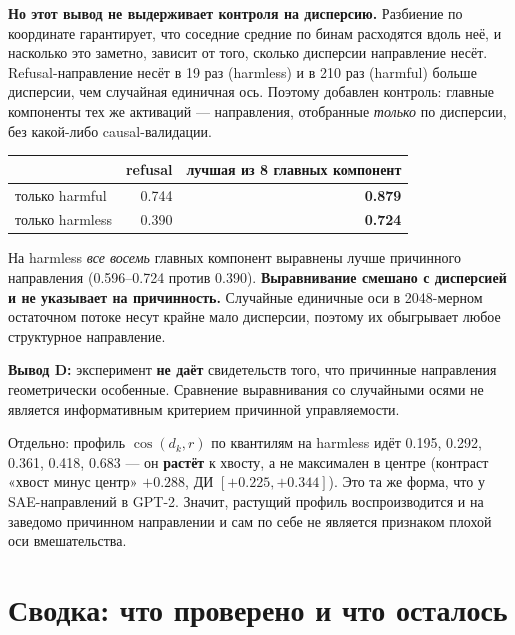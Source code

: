 \documentclass[10pt,a4paper]{article}
\begin{document}
\textbf{Но этот вывод не выдерживает контроля на дисперсию.} Разбиение по
координате гарантирует, что соседние средние по бинам расходятся вдоль неё, и
насколько это заметно, зависит от того, сколько дисперсии направление несёт.
Refusal-направление несёт в 19 раз (harmless) и в 210 раз (harmful) больше
дисперсии, чем случайная единичная ось. Поэтому добавлен контроль:
главные компоненты тех же активаций — направления, отобранные \emph{только} по
дисперсии, без какой-либо causal-валидации.

\begin{center}\small
\begin{tabular}{@{}lrr@{}}
\toprule
& refusal & лучшая из 8 главных компонент\\
\midrule
только harmful & 0.744 & \textbf{0.879}\\
только harmless & 0.390 & \textbf{0.724}\\
\bottomrule
\end{tabular}
\end{center}

\medskip
На harmless \emph{все восемь} главных компонент выравнены лучше причинного
направления (0.596--0.724 против 0.390). \textbf{Выравнивание смешано с дисперсией и не указывает на причинность.}
Случайные единичные оси в 2048-мерном остаточном
потоке несут крайне мало дисперсии, поэтому их обыгрывает любое структурное
направление.

\textbf{Вывод D:} эксперимент \textbf{не даёт} свидетельств того, что причинные
направления геометрически особенные. Сравнение выравнивания со случайными осями
не является информативным критерием причинной управляемости.

Отдельно: профиль $\cos(d_k, r)$ по квантилям на harmless идёт
0.195, 0.292, 0.361, 0.418, 0.683 — он \textbf{растёт} к хвосту, а не
максимален в центре (контраст «хвост минус центр» $+0.288$, ДИ
$[+0.225, +0.344]$). Это та же форма, что у SAE-направлений в GPT-2. Значит,
растущий профиль воспроизводится и на заведомо причинном направлении и сам по
себе не является признаком плохой оси вмешательства.

\section{Сводка: что проверено и что осталось}\label{sec:summary}
\end{document}
